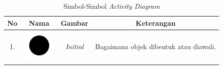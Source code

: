 \begin{table}[htbp]
    \captionsetup{labelfont=bf, textfont=bf}
    \caption{Simbol-Simbol \textit{Activity Diagram}}
    \label{tab:simbolactdiagram}
    \vspace{-20pt}
    \begin{center}
        \begin{tabular}{|c|c|c|c| }
            \hline
            No & Nama                       & Gambar           & Keterangan                                \\ \hline

            1. & \begin{minipage}{.1\textwidth}
                \includegraphics[width=\linewidth]{bab2/gambar/uml/initial.jpg}
            \end{minipage} & \textit{Initial} & Bagaimana  objek  dibentuk  atau diawali. \\ \hline


\end{tabular}
\end{center}
\end{table}
